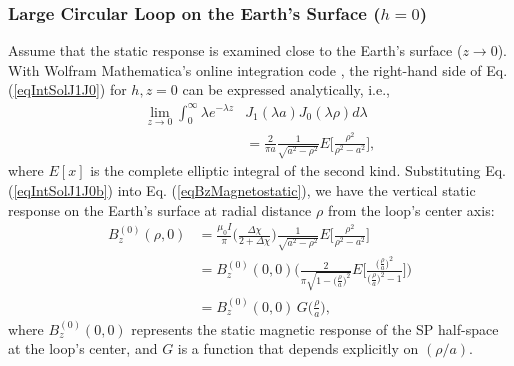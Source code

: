 \documentclass[onecolumn]{IEEEtran} %
\begin{document}
\subsubsection{Large Circular Loop on the Earth's Surface ($h=0$)}
Assume that the static response is examined close to the Earth's
surface ($z \rightarrow 0$). With Wolfram
Mathematica's online integration code \cite{Wolfram2016}, the
right-hand side of Eq. (\ref{eqIntSolJ1J0}) for $h,z = 0$ can be
expressed analytically, i.e.,
\begin{align}
\lim_{z \rightarrow 0} \int^{\infty}_0 \lambda e^{-\lambda z} &J_1(\lambda a) J_0 (\lambda \rho) d \lambda \nonumber \\
\label{eqIntSolJ1J0b} &= \frac{2 }{\pi a} \frac{1}{\sqrt{a^2-\rho
^2}} E \Bigg [ \frac{\rho^2}{\rho^2 - a^2} \Bigg ],
\end{align}
where $E[x]$ is the complete elliptic integral of the second kind.
Substituting Eq. (\ref{eqIntSolJ1J0b}) into Eq.
(\ref{eqBzMagnetostatic}), we have the vertical static response on
the Earth's surface at radial distance $\rho$ from the loop's center
axis:
\begin{equation}
\begin{split}
B^{(0)}_z(\rho,0) &= \frac{\mu_0 I}{\pi} \Bigg ( \frac{\Delta \chi}{2+\Delta \chi} \Bigg )
 \frac{1}{\sqrt{a^2 -\rho^2}} E \Bigg [ \frac{ \rho^2}{\rho^2 - a^2} \Bigg ] \\
&= B^{(0)}_z(0,0) \Bigg ( \frac{2 }{\pi \sqrt{1 -\big ( \frac{\rho}{a}
\big )^2}} E \Bigg [ \frac{ \big (\frac{\rho}{a} \big )^2}{\big
(\frac{\rho}{a} \big )^2 - 1} \Bigg ] \Bigg )
\\
&= B_z^{(0)}(0,0) \, G \Big (\frac{\rho}{a} \Big ),
\end{split}
\label{eqIntSolJ1J0a3}
\end{equation}
where $B^{(0)}_z (0, 0)$  represents the static magnetic
response of the SP half-space at the loop's center, and $G$ is a
function that depends explicitly on $(\rho /a)$.
\\
\end{document}
